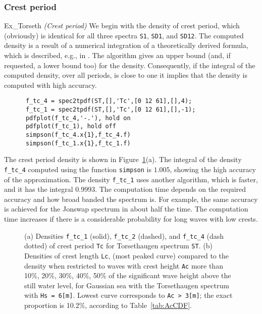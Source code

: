 \subsubsection{Crest period}
\begin{cex}{Ex_Torseth} {\sl (Crest period)}\label{pageTorsethCrestPeriod}
We begin with the density of crest period, which (obviously) is
identical for all three spectra {\tt S1}, {\tt SD1}, and {\tt SD12}.
The computed density is a result of a numerical integration
of a theoretically derived formula, which is described, e.g., in
\cite{LindgrenAndRychlik1991Slepian}.
The algorithm gives an upper bound
(and, if requested, a lower bound too) for the density.
Consequently, if the integral of the computed density, over
all periods, is close to one it implies that the density is computed with
high accuracy.
{\small\begin{verbatim}
      f_tc_4 = spec2tpdf(ST,[],'Tc',[0 12 61],[],4);
      f_tc_1 = spec2tpdf(ST,[],'Tc',[0 12 61],[],-1);
      pdfplot(f_tc_4,'-.'), hold on
      pdfplot(f_tc_1), hold off
      simpson(f_tc_4.x{1},f_tc_4.f)
      simpson(f_tc_1.x{1},f_tc_1.f)
\end{verbatim}}

The crest period density is shown in Figure~\ref{fig71}(a).
The integral of the density {\tt f\_tc\_4} computed using the function
{\tt simpson} is $1.005$, showing the high accuracy of the approximation.
The density {\tt f\_tc\_1} uses another algorithm, which is faster, and
it has the integral 0.9993. 
The computation time depends on the required accuracy and how
broad banded the spectrum is. For example, the same accuracy is achieved
for the {\sc Jonswap} spectrum in about half the time.
The computation time increases if there is a considerable
probability for long waves with low crests. 

\begin{figure}[h]
%
\hfill
{}
\vspace{-3mm}
  \caption[Density of crest period {\tt Tc} and  crest length
  {\tt Lc}]{
(a) Densities {\tt f\_tc\_1} (solid), {\tt f\_tc\_2} (dashed),
and {\tt f\_tc\_4} (dash dotted)
of crest period {\tt Tc} for Torsethaugen spectrum {\tt ST}.
(b) Densities of crest length
{\tt Lc}, (most peaked curve) compared to the density when restricted
to waves with crest height {\tt Ac} more than 10\%, 20\%, 30\%, 40\%, 50\%
of the significant wave height above the still water level,
for Gaussian sea with the Torsethaugen spectrum with {\tt Hs = 6[m]}.
Lowest curve corresponds to {\tt Ac > 3[m]}; the exact proportion is 10.2\%, 
according to Table~\ref{tab:AcCDF}.
}
  \label{fig71}
\end{figure}



\end{cex}
